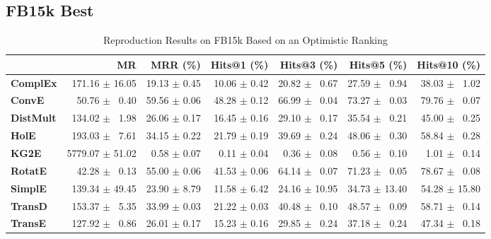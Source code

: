 \documentclass[journal]{IEEEtran}
\begin{document}
\subsection{FB15k Best}
\begin{table*}
    \caption{Reproduction Results on FB15k Based on an Optimistic Ranking}
    \label{tab:fb15k_full_results_optimistic_ranking}
    \centering
    \begin{tabular}{lrrrrrr}
\toprule
{} &               MR &      MRR (\%) &   Hits@1 (\%) &    Hits@3 (\%) &    Hits@5 (\%) &   Hits@10 (\%) \\
\midrule
\textbf{ComplEx } &  $\phantom{5}$171.16 $\pm$ 16.05 &  19.13 $\pm$ 0.45 &  10.06 $\pm$ 0.42 &  20.82 $\pm$ $\phantom{5}$0.67 &  27.59 $\pm$ $\phantom{5}$0.94 &  38.03 $\pm$ $\phantom{5}$1.02 \\
\textbf{ConvE   } &  $\phantom{5}$$\phantom{5}$50.76 $\pm$ $\phantom{5}$0.40 &  59.56 $\pm$ 0.06 &  48.28 $\pm$ 0.12 &  66.99 $\pm$ $\phantom{5}$0.04 &  73.27 $\pm$ $\phantom{5}$0.03 &  79.76 $\pm$ $\phantom{5}$0.07 \\
\textbf{DistMult} &  $\phantom{5}$134.02 $\pm$ $\phantom{5}$1.98 &  26.06 $\pm$ 0.17 &  16.45 $\pm$ 0.16 &  29.10 $\pm$ $\phantom{5}$0.17 &  35.54 $\pm$ $\phantom{5}$0.21 &  45.00 $\pm$ $\phantom{5}$0.25 \\
\textbf{HolE    } &  $\phantom{5}$193.03 $\pm$ $\phantom{5}$7.61 &  34.15 $\pm$ 0.22 &  21.79 $\pm$ 0.19 &  39.69 $\pm$ $\phantom{5}$0.24 &  48.06 $\pm$ $\phantom{5}$0.30 &  58.84 $\pm$ $\phantom{5}$0.28 \\
\textbf{KG2E    } &  5779.07 $\pm$ 51.02 &  $\phantom{5}$0.58 $\pm$ 0.07 &  $\phantom{5}$0.11 $\pm$ 0.04 &  $\phantom{5}$0.36 $\pm$ $\phantom{5}$0.08 &  $\phantom{5}$0.56 $\pm$ $\phantom{5}$0.10 &  $\phantom{5}$1.01 $\pm$ $\phantom{5}$0.14 \\
\textbf{RotatE  } &  $\phantom{5}$$\phantom{5}$42.28 $\pm$ $\phantom{5}$0.13 &  55.00 $\pm$ 0.06 &  41.53 $\pm$ 0.06 &  64.14 $\pm$ $\phantom{5}$0.07 &  71.23 $\pm$ $\phantom{5}$0.05 &  78.67 $\pm$ $\phantom{5}$0.08 \\
\textbf{SimplE  } &  $\phantom{5}$139.34 $\pm$ 49.45 &  23.90 $\pm$ 8.79 &  11.58 $\pm$ 6.42 &  24.16 $\pm$ 10.95 &  34.73 $\pm$ 13.40 &  54.28 $\pm$ 15.80 \\
\textbf{TransD  } &  $\phantom{5}$153.37 $\pm$ $\phantom{5}$5.35 &  33.99 $\pm$ 0.03 &  21.22 $\pm$ 0.03 &  40.48 $\pm$ $\phantom{5}$0.10 &  48.57 $\pm$ $\phantom{5}$0.09 &  58.71 $\pm$ $\phantom{5}$0.14 \\
\textbf{TransE  } &  $\phantom{5}$127.92 $\pm$ $\phantom{5}$0.86 &  26.01 $\pm$ 0.17 &  15.23 $\pm$ 0.16 &  29.85 $\pm$ $\phantom{5}$0.24 &  37.18 $\pm$ $\phantom{5}$0.24 &  47.34 $\pm$ $\phantom{5}$0.18 \\

\end{tabular}
\end{table*}
\end{document}
